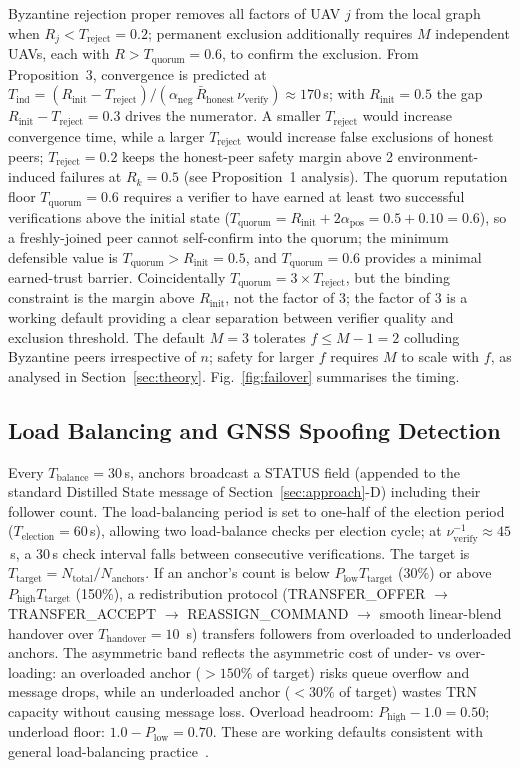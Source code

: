 \documentclass[conference,10pt]{IEEEtran}
\begin{document}
Byzantine rejection proper removes all factors of UAV $j$ from the local graph when $R_j < T_\text{reject} = 0.2$; permanent exclusion additionally requires $M$ independent UAVs, each with $R > T_\text{quorum} = 0.6$, to confirm the exclusion. From Proposition~3, convergence is predicted at $T_\text{ind} = (R_\text{init}-T_\text{reject})/(\alpha_\text{neg}\,\bar{R}_\text{honest}\,\nu_\text{verify}) \approx 170$\,s; with $R_\text{init}=0.5$ the gap $R_\text{init}-T_\text{reject}=0.3$ drives the numerator. A smaller $T_\text{reject}$ would increase convergence time, while a larger $T_\text{reject}$ would increase false exclusions of honest peers; $T_\text{reject}=0.2$ keeps the honest-peer safety margin above 2 environment-induced failures at $R_k=0.5$ (see Proposition~1 analysis). The quorum reputation floor $T_\text{quorum}=0.6$ requires a verifier to have earned at least two successful verifications above the initial state ($T_\text{quorum} = R_\text{init} + 2\alpha_\text{pos} = 0.5 + 0.10 = 0.6$), so a freshly-joined peer cannot self-confirm into the quorum; the minimum defensible value is $T_\text{quorum} > R_\text{init} = 0.5$, and $T_\text{quorum}=0.6$ provides a minimal earned-trust barrier. Coincidentally $T_\text{quorum} = 3 \times T_\text{reject}$, but the binding constraint is the margin above $R_\text{init}$, not the factor of $3$; the factor of $3$ is a working default providing a clear separation between verifier quality and exclusion threshold. The default $M = 3$ tolerates $f \leq M-1 = 2$ colluding Byzantine peers irrespective of $n$; safety for larger $f$ requires $M$ to scale with $f$, as analysed in Section~\ref{sec:theory}. Fig.~\ref{fig:failover} summarises the timing.

\subsection{Load Balancing and GNSS Spoofing Detection}

Every $T_\text{balance} = 30$\,s, anchors broadcast a STATUS field (appended to the standard Distilled State message of Section~\ref{sec:approach}-D) including their follower count. The load-balancing period is set to one-half of the election period ($T_\text{election}=60$\,s), allowing two load-balance checks per election cycle; at $\nu_\text{verify}^{-1}\approx 45$\,s, a 30\,s check interval falls between consecutive verifications. The target is $T_\text{target} = N_\text{total}/N_\text{anchors}$. If an anchor's count is below $P_\text{low} T_\text{target}$ (30\%) or above $P_\text{high} T_\text{target}$ (150\%), a redistribution protocol (TRANSFER\_OFFER $\rightarrow$ TRANSFER\_ACCEPT $\rightarrow$ REASSIGN\_COMMAND $\rightarrow$ smooth linear-blend handover over $T_\text{handover} = 10$~s) transfers followers from overloaded to underloaded anchors. The asymmetric band reflects the asymmetric cost of under- vs over-loading: an overloaded anchor ($>150\%$ of target) risks queue overflow and message drops, while an underloaded anchor ($<30\%$ of target) wastes TRN capacity without causing message loss. Overload headroom: $P_\text{high}-1.0=0.50$; underload floor: $1.0-P_\text{low}=0.70$. These are working defaults consistent with general load-balancing practice~\cite{eager1986adaptive}.
\end{document}
